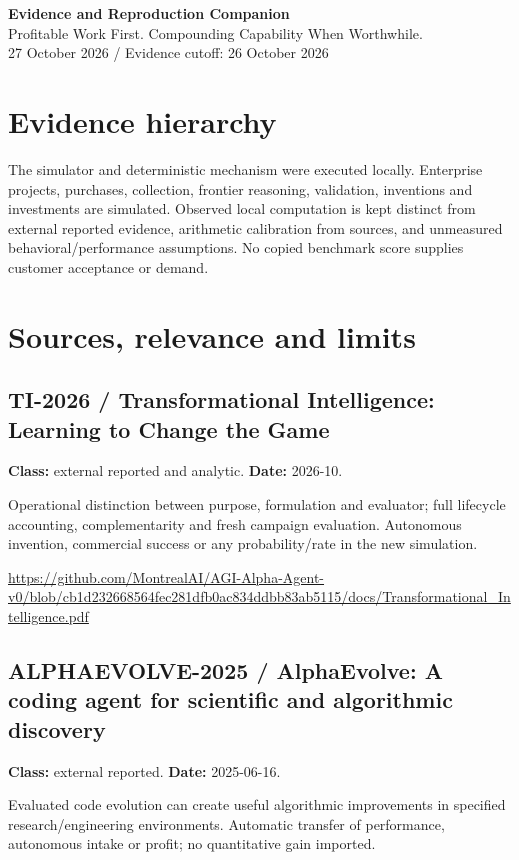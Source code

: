 \documentclass[10pt]{article}
\begin{document}
\begin{center}{\LARGE\bfseries Evidence and Reproduction Companion}\\[9pt]{\large Profitable Work First. Compounding Capability When Worthwhile.}\\[7pt]27 October 2026 / Evidence cutoff: 26 October 2026\end{center}
\section{Evidence hierarchy}
The simulator and deterministic mechanism were executed locally. Enterprise projects, purchases, collection, frontier reasoning, validation, inventions and investments are simulated. Observed local computation is kept distinct from external reported evidence, arithmetic calibration from sources, and unmeasured behavioral/performance assumptions. No copied benchmark score supplies customer acceptance or demand.
\section{Sources, relevance and limits}


\subsection*{TI-2026 / Transformational Intelligence: Learning to Change the Game}

\textbf{Class:} external reported and analytic. \textbf{Date:} 2026-10.

Operational distinction between purpose, formulation and evaluator; full lifecycle accounting, complementarity and fresh campaign evaluation. Autonomous invention, commercial success or any probability/rate in the new simulation.

\url{https://github.com/MontrealAI/AGI-Alpha-Agent-v0/blob/cb1d232668564fec281dfb0ac834ddbb83ab5115/docs/Transformational_Intelligence.pdf}

\subsection*{ALPHAEVOLVE-2025 / AlphaEvolve: A coding agent for scientific and algorithmic discovery}

\textbf{Class:} external reported. \textbf{Date:} 2025-06-16.

Evaluated code evolution can create useful algorithmic improvements in specified research/engineering environments. Automatic transfer of performance, autonomous intake or profit; no quantitative gain imported.
\end{document}
